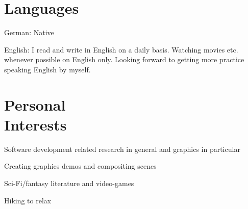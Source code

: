 \documentclass[margin,line]{Ofenberg_Resume}
\begin{document}
\begin{resume}
	\section{\mysidestyle Languages}
	\begin{list2}
		\item German: Native
		\item English: I read and write in English on a daily basis. Watching movies etc. whenever possible on English only. Looking forward to getting more practice speaking English by myself.
	\end{list2}\vspace{-1.5mm}


	\section{\mysidestyle Personal\\Interests}
	\begin{list2}
		\item Software development related research in general and graphics in particular
		\item Creating graphics demos and compositing scenes
		\item Sci-Fi/fantasy literature and video-games
		\item Hiking to relax
	\end{list2}\vspace{-1.5mm}


\end{resume}
\end{document}
